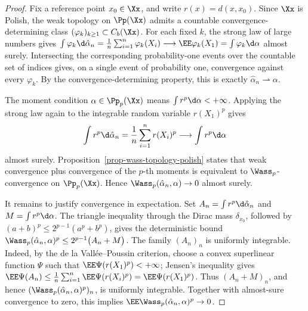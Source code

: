 \begin{proof}
	Fix a reference point \(x_0\in\Xx\), and write \(r(x)=d(x,x_0)\). Since \(\Xx\) is Polish, the weak topology on \(\Pp(\Xx)\) admits a countable convergence-determining class \((\varphi_k)_{k\geq1}\subset C_b(\Xx)\). For each fixed \(k\), the strong law of large numbers gives
	$\int \varphi_k\d\hat\alpha_n = \frac1n\sum_{i=1}^n\varphi_k(X_i) \longrightarrow \EE\varphi_k(X_1) = \int\varphi_k\d\alpha$
	almost surely. Intersecting the corresponding probability-one events over the countable set of indices gives, on a single event of probability one, convergence against every \(\varphi_k\). By the convergence-determining property, this is exactly \(\hat\alpha_n\rightharpoonup\alpha\).

	The moment condition \(\alpha\in\Pp_p(\Xx)\) means \(\int r^p\d\alpha<+\infty\). Applying the strong law again to the integrable random variable \(r(X_1)^p\) gives
	\[
		\int r^p\d\hat\alpha_n
		=
		\frac1n\sum_{i=1}^n r(X_i)^p
		\longrightarrow
		\int r^p\d\alpha
	\]
	almost surely. Proposition~\ref{prop-wass-topology-polish} states that weak convergence plus convergence of the \(p\)-th moments is equivalent to \(\Wass_p\)-convergence on \(\Pp_p(\Xx)\). Hence \(\Wass_p(\hat\alpha_n,\alpha)\to0\) almost surely.

	It remains to justify convergence in expectation. Set \(A_n=\int r^p\d\hat\alpha_n\) and \(M=\int r^p\d\alpha\). The triangle inequality through the Dirac mass \(\delta_{x_0}\), followed by \((a+b)^p\leq2^{p-1}(a^p+b^p)\), gives the deterministic bound
	$\Wass_p(\hat\alpha_n,\alpha)^p \leq 2^{p-1}\big(A_n+M\big)$.
	The family \((A_n)_n\) is uniformly integrable. Indeed, by the de la Vall\'ee--Poussin criterion, choose a convex superlinear function \(\Psi\) such that \(\EE\Psi(r(X_1)^p)<+\infty\); Jensen's inequality gives
	$\EE\Psi(A_n) \leq \frac1n\sum_{i=1}^n \EE\Psi(r(X_i)^p) = \EE\Psi(r(X_1)^p)$.
	Thus \((A_n+M)_n\), and hence \((\Wass_p(\hat\alpha_n,\alpha)^p)_n\), is uniformly integrable. Together with almost-sure convergence to zero, this implies \(\EE\Wass_p(\hat\alpha_n,\alpha)^p\to0\).
\end{proof}

